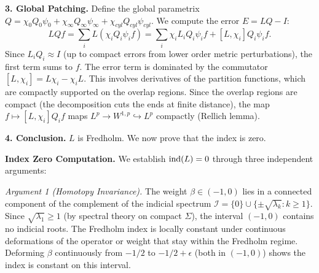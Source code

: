 \textbf{3. Global Patching.}
Define the global parametrix $Q = \chi_0 Q_0 \psi_0 + \chi_\infty Q_\infty \psi_\infty + \chi_{cyl} Q_{cyl} \psi_{cyl}$.
We compute the error $E = LQ - I$:
\[ LQ f = \sum_i L(\chi_i Q_i \psi_i f) = \sum_i \chi_i L_i Q_i \psi_i f + [L, \chi_i] Q_i \psi_i f. \]
Since $L_i Q_i \approx I$ (up to compact errors from lower order metric perturbations), the first term sums to $f$.
The error term is dominated by the commutator $[L, \chi_i] = L\chi_i - \chi_i L$. This involves derivatives of the partition functions, which are compactly supported on the overlap regions.
Since the overlap regions are compact (the decomposition cuts the ends at finite distance), the map $f \mapsto [L, \chi_i] Q_i f$ maps $L^p \to W^{1,p} \hookrightarrow L^p$ compactly (Rellich lemma).

\textbf{4. Conclusion.}
$L$ is Fredholm. We now prove that the index is zero.

\textbf{Index Zero Computation.}
We establish $\mathrm{ind}(L) = 0$ through three independent arguments:

\textit{Argument 1 (Homotopy Invariance).}
The weight $\beta \in (-1,0)$ lies in a connected component of the complement of the indicial spectrum $\mathcal{I} = \{0\} \cup \{\pm\sqrt{\lambda_k} : k \ge 1\}$. Since $\sqrt{\lambda_1} \ge 1$ (by spectral theory on compact $\Sigma$), the interval $(-1,0)$ contains no indicial roots. The Fredholm index is locally constant under continuous deformations of the operator or weight that stay within the Fredholm regime. Deforming $\beta$ continuously from $-1/2$ to $-1/2 + \epsilon$ (both in $(-1,0)$) shows the index is constant on this interval.

